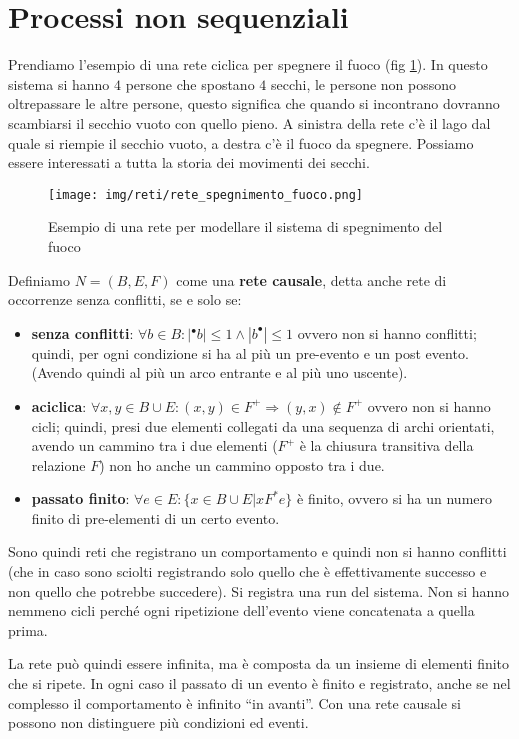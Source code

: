 \section{Processi non sequenziali}
Prendiamo l'esempio di una rete ciclica per spegnere il fuoco (fig \ref{fig:spegnimento-fuoco}).
In questo sistema si hanno $4$ persone che spostano $4$ secchi, le persone non possono
oltrepassare le altre persone, questo significa che quando si incontrano dovranno
scambiarsi il secchio vuoto con quello pieno. A sinistra della rete c'è il lago dal quale
si riempie il secchio vuoto, a destra c'è il fuoco da spegnere. Possiamo essere
interessati a tutta la storia dei movimenti dei secchi.
\begin{figure}[!ht]
    \centering
    \texttt{[image: img/reti/rete\_spegnimento\_fuoco.png]}
    \caption{Esempio di una rete per modellare il sistema di spegnimento del fuoco}
    \label{fig:spegnimento-fuoco}
\end{figure}
\begin{definizione}
    Definiamo $N = (B,E, F)$ come una \textbf{rete causale}, detta anche rete di
    occorrenze senza conflitti, se e solo se:
    \begin{itemize}
        \item \textbf{senza conflitti}: $\forall b \in B: |^{\bullet}b| \leq 1 \land |b^{\bullet}| \leq 1$
              ovvero non si hanno conflitti; quindi, per ogni condizione si ha al più
              un pre-evento e un post evento. (Avendo quindi al più un arco entrante
              e al più uno uscente).
        \item \textbf{aciclica}: $\forall x, y \in B \cup E: (x, y) \in F^{+} \Rightarrow (y, x) \notin F^{+}$
              ovvero non si hanno cicli; quindi, presi due elementi collegati da una
              sequenza di archi orientati, avendo un cammino tra i due elementi ($F^{+}$
              è la chiusura transitiva della relazione $F$) non ho anche un cammino
              opposto tra i due.
        \item \textbf{passato finito}: $\forall e \in E: \{x \in B \cup E | xF^{\ast}e\}$ è finito, ovvero
              si ha un numero finito di pre-elementi di un certo evento.
    \end{itemize}
    Sono quindi reti che registrano un comportamento e quindi non si hanno
    conflitti (che in caso sono sciolti registrando solo quello che è effettivamente
    successo e non quello che potrebbe succedere). Si registra una run del sistema.
    Non si hanno nemmeno cicli perché ogni ripetizione dell'evento viene concatenata
    a quella prima.

    La rete può quindi essere infinita, ma è composta da un insieme di elementi
    finito che si ripete. In ogni caso il passato di un evento è finito e registrato,
    anche se nel complesso il comportamento è infinito “in avanti”. Con una rete
    causale si possono non distinguere più condizioni ed eventi.
\end{definizione}
